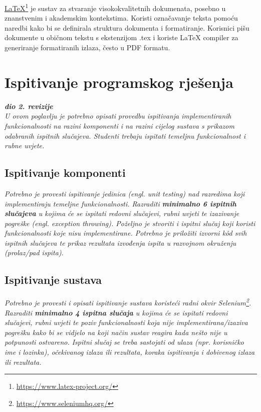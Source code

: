 \underline{LaTeX}\footnote{\url{https://www.latex-project.org/}} je sustav za stvaranje visokokvalitetnih dokumenata, posebno u znanstvenim i akademskim kontekstima. Koristi označavanje teksta pomoću naredbi kako bi se definirala struktura dokumenta i formatiranje. Korisnici pišu dokumente u običnom tekstu s ekstenzijom .tex i koriste LaTeX compiler za generiranje formatiranih izlaza, često u PDF formatu.


\eject 


\section{Ispitivanje programskog rješenja}

\textbf{\textit{dio 2. revizije}}\\

\textit{U ovom poglavlju je potrebno opisati provedbu ispitivanja implementiranih funkcionalnosti na razini komponenti i na razini cijelog sustava s prikazom odabranih ispitnih slučajeva. Studenti trebaju ispitati temeljnu funkcionalnost i rubne uvjete.}


\subsection{Ispitivanje komponenti}
\textit{Potrebno je provesti ispitivanje jedinica (engl. unit testing) nad razredima koji implementiraju temeljne funkcionalnosti. Razraditi \textbf{minimalno 6 ispitnih slučajeva} u kojima će se ispitati redovni slučajevi, rubni uvjeti te izazivanje pogreške (engl. exception throwing). Poželjno je stvoriti i ispitni slučaj koji koristi funkcionalnosti koje nisu implementirane. Potrebno je priložiti izvorni kôd svih ispitnih slučajeva te prikaz rezultata izvođenja ispita u razvojnom okruženju (prolaz/pad ispita). }



\subsection{Ispitivanje sustava}

\textit{Potrebno je provesti i opisati ispitivanje sustava koristeći radni okvir Selenium\footnote{\url{https://www.seleniumhq.org/}}. Razraditi \textbf{minimalno 4 ispitna slučaja} u kojima će se ispitati redovni slučajevi, rubni uvjeti te poziv funkcionalnosti koja nije implementirana/izaziva pogrešku kako bi se vidjelo na koji način sustav reagira kada nešto nije u potpunosti ostvareno. Ispitni slučaj se treba sastojati od ulaza (npr. korisničko ime i lozinka), očekivanog izlaza ili rezultata, koraka ispitivanja i dobivenog izlaza ili rezultata.\\ }

